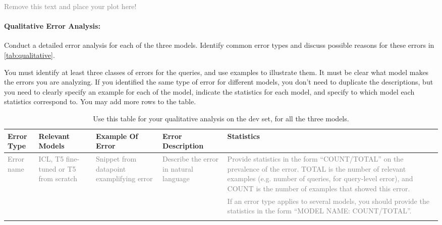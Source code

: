 \documentclass{article}
\begin{document}
\textcolor{gray}{Remove this text and place your plot here!}

\newpage

\paragraph{Qualitative Error Analysis:} Conduct a detailed error analysis for each of the three models. Identify common error types and discuss possible reasons for these errors in \autoref{tab:qualitative}.

You must identify at least three classes of errors for the queries, and use examples to illustrate them.
It must be clear what model makes the errors you are analyzing. 
If you identified the same type of error for different models, you don't need to duplicate the descriptions, but you need to clearly specify an example for each of the model, indicate the statistics for each model, and specify to which model each statistics correspond to.
You may add more rows to the table.


\begin{landscape}
\begin{table}
  \centering
  \begin{tabular}{p{2cm}p{2cm}p{6cm}p{6cm}p{6cm}}
    \toprule
    \textbf{Error Type} & \textbf{Relevant Models}& \textbf{Example Of Error} & \textbf{Error Description} & \textbf{Statistics} \\
    \midrule
    \textcolor{gray}{Error name} & \textcolor{gray}{ICL, T5 fine-tuned or T5 from scratch} & \textcolor{gray}{Snippet from datapoint examplifying error} & \textcolor{gray}{Describe the error in natural language} & \textcolor{gray}{Provide statistics in the form ``COUNT/TOTAL'' on the prevalence of the error. TOTAL is the number of relevant examples (e.g. number of queries, for query-level error), and COUNT is the number of examples that showed this error.}  \\
    & & & & \textcolor{gray}{If an error type applies to several models, you should provide the statistics in the form ``MODEL NAME: COUNT/TOTAL''.} \\
    \midrule
    &  &  &  & \\
    \bottomrule
  \end{tabular}
  \label{tab:qualitative}
  \caption{Use this table for your qualitative analysis on the dev set, for all the three models.}\label{tab:qualitative}
\end{table}
\end{landscape}
\end{document}
